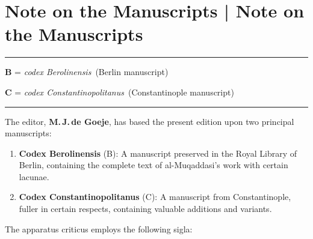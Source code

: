 \documentclass[11pt,a4paper]{article}
\newcommand{\codB}{\textit{codex Berolinensis}}
\newcommand{\codC}{\textit{codex Constantinopolitanus}}
\begin{document}
\clearpage


\section*{Note on the Manuscripts | Note on the Manuscripts}

\begin{center}
\rule{0.5\textwidth}{0.6pt}
\end{center}

\vspace{0.3cm}

\textbf{B} = \codB\ (Berlin manuscript)

\textbf{C} = \codC\ (Constantinople manuscript)

\vspace{0.3cm}

\begin{center}
\rule{0.5\textwidth}{0.6pt}
\end{center}

\vspace{0.3cm}

The editor, \textbf{M.\,J.\,de Goeje}, has based the present edition upon two principal manuscripts:

\begin{enumerate}[label=\alph*),leftmargin=2em]
\item \textbf{Codex Berolinensis} (B): A manuscript preserved in the Royal Library of Berlin, containing the complete text of al-Muqaddasi's work with certain lacunae.
\item \textbf{Codex Constantinopolitanus} (C): A manuscript from Constantinople, fuller in certain respects, containing valuable additions and variants.
\end{enumerate}

\vspace{0.3cm}

The apparatus criticus employs the following sigla:
\end{document}
